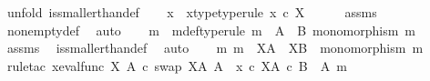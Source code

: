\begin{isabellebody}
%
\isadelimproof
%
\endisadelimproof
%
\isatagproof
{}\isamarkupfalse%
\ {\isacharparenleft}{\kern0pt}unfold\ is{\isacharunderscore}{\kern0pt}smaller{\isacharunderscore}{\kern0pt}than{\isacharunderscore}{\kern0pt}def{\isacharparenright}{\kern0pt}\isanewline
\ \ \isamarkupfalse%
\ x\ \ x{\isacharunderscore}{\kern0pt}type{\isacharbrackleft}{\kern0pt}type{\isacharunderscore}{\kern0pt}rule{\isacharbrackright}{\kern0pt}{\isacharcolon}{\kern0pt}\ {\isachardoublequoteopen}x\ {\isasymin}\isactrlsub c\ X{\isachardoublequoteclose}\isanewline
\ \ \ \ \isamarkupfalse%
\ assms{\isacharparenleft}{\kern0pt}{}{\isacharparenright}{\kern0pt}\ \isamarkupfalse%
\ nonempty{\isacharunderscore}{\kern0pt}def\ \isamarkupfalse%
\ auto\isanewline
\ \ \isamarkupfalse%
\ m\ \ m{\isacharunderscore}{\kern0pt}def{\isacharbrackleft}{\kern0pt}type{\isacharunderscore}{\kern0pt}rule{\isacharbrackright}{\kern0pt}{\isacharcolon}{\kern0pt}\ {\isachardoublequoteopen}m\ {\isacharcolon}{\kern0pt}\ A\ {\isasymrightarrow}\ B{\isachardoublequoteclose}\ {\isachardoublequoteopen}monomorphism\ m{\isachardoublequoteclose}\isanewline
\ \ \ \ \isamarkupfalse%
\ assms{\isacharparenleft}{\kern0pt}{}{\isacharparenright}{\kern0pt}\ \isamarkupfalse%
\ is{\isacharunderscore}{\kern0pt}smaller{\isacharunderscore}{\kern0pt}than{\isacharunderscore}{\kern0pt}def\ \isamarkupfalse%
\ auto\isanewline
\ \ \isamarkupfalse%
\ {\isachardoublequoteopen}{\isasymexists}m{\isachardot}{\kern0pt}\ m\ {\isacharcolon}{\kern0pt}\ X\isactrlbsup A\isactrlesup \ {\isasymrightarrow}\ X\isactrlbsup B\isactrlesup \ {\isasymand}\ monomorphism\ m{\isachardoublequoteclose}\isanewline
\ \ \isamarkupfalse%
\ {\isacharparenleft}{\kern0pt}rule{\isacharunderscore}{\kern0pt}tac\ x{\isacharequal}{\kern0pt}{\isachardoublequoteopen}{\isacharparenleft}{\kern0pt}{\isacharparenleft}{\kern0pt}{\isacharparenleft}{\kern0pt}eval{\isacharunderscore}{\kern0pt}func\ X\ A\ {\isasymcirc}\isactrlsub c\ swap\ {\isacharparenleft}{\kern0pt}X\isactrlbsup A\isactrlesup {\isacharparenright}{\kern0pt}\ A{\isacharparenright}{\kern0pt}\ {\isasymamalg}\ {\isacharparenleft}{\kern0pt}x\ {\isasymcirc}\isactrlsub c\ {\isasymbeta}\isactrlbsub X\isactrlbsup A\isactrlesup \ {\isasymtimes}\isactrlsub c\ {\isacharparenleft}{\kern0pt}B\ {\isasymsetminus}\ {\isacharparenleft}{\kern0pt}A{\isacharcomma}{\kern0pt}\ m{\isacharparenright}{\kern0pt}{\isacharparenright}{\kern0pt}\isactrlesub {\isacharparenright}{\kern0pt}{\isacharparenright}{\kern0pt}\isanewline

\end{isabellebody}
